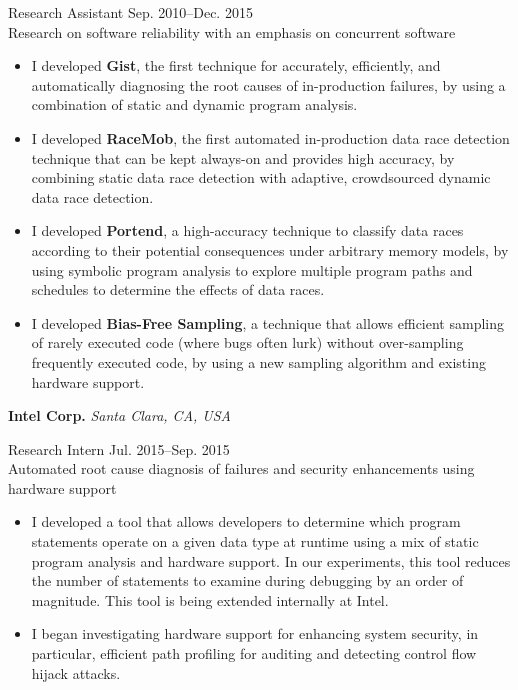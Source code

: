 \documentclass[10pt]{article}
\newcommand{\mysub}[3]{\textbf{#1} {#2} \hfill {\em #3}}
\newcommand{\myssub}[1]{\hspace*{2mm}\parbox{163mm}{#1}\vspace*{2mm}}
\begin{document}
\myssub{\vspace{1mm}Research Assistant \hfill Sep. 2010--Dec. 2015 \\
Research on software reliability with an emphasis on concurrent software
\vspace{-1mm}
\begin{itemize}
\setlength\itemsep{0em}
\item{I developed \textbf{Gist}, the first technique for accurately, efficiently, and automatically diagnosing the root causes of in-production failures, by using a combination of static and dynamic program analysis.}
\item{I developed \textbf{RaceMob}, the first automated in-production data race detection technique that can be kept always-on and provides high accuracy, by combining static data race detection with adaptive, crowdsourced dynamic data race detection.}
\item{I developed \textbf{Portend}, a high-accuracy technique to classify data races according to their potential consequences under arbitrary memory models, by using symbolic program analysis to explore multiple program paths and schedules to determine the effects of data races.}
\item{I developed \textbf{Bias-Free Sampling}, a technique that allows efficient sampling of rarely executed code (where bugs often lurk) without over-sampling frequently executed code, by using a new sampling algorithm and existing hardware support.}\\
\end{itemize}
\vspace{-5mm}
}


\mysub{Intel Corp.}{}{Santa Clara, CA, USA} \\
\myssub{\vspace{1mm}Research Intern \hfill Jul. 2015--Sep. 2015\\
Automated root cause diagnosis of failures and security enhancements using hardware support
\vspace{-1mm}
\begin{itemize}
\setlength\itemsep{0em}
\item{I developed a tool that allows developers to determine which program statements operate on a given data type at runtime using a mix of static program analysis and hardware support. In our experiments, this tool reduces the number of statements to examine during debugging by an order of magnitude. This tool is being extended internally at Intel.}
\item{I began investigating hardware support for enhancing system security, in particular, efficient path profiling for auditing and detecting control flow hijack attacks.}
\end{itemize}
\vspace{-2mm}
}
\end{document}
